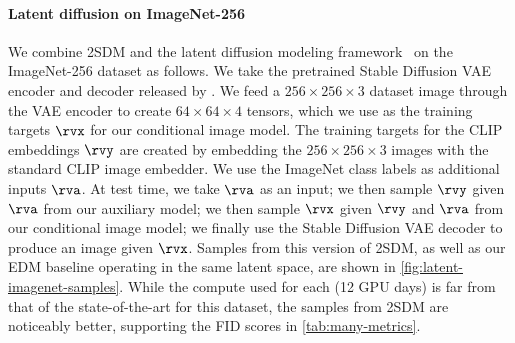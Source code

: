 
\paragraph{Latent diffusion on ImageNet-256}
We combine 2SDM and the latent diffusion modeling framework~\citep{rombach2022high} on the ImageNet-256 dataset as follows. We take the pretrained Stable Diffusion VAE encoder and decoder released by \citet{rombach2022high}. We feed a $256\times256\times3$ dataset image through the VAE encoder to create $64\times64\times4$ tensors, which we use as the training targets $\rvx$ for our conditional image model. The training targets for the CLIP embeddings $\rvy$ are created by embedding the $256\times256\times3$ images with the standard CLIP image embedder. We use the ImageNet class labels as additional inputs $\rva$. At test time, we take $\rva$ as an input; we then sample $\rvy$ given $\rva$ from our auxiliary model; we then sample $\rvx$ given $\rvy$ and $\rva$ from our conditional image model; we finally use the Stable Diffusion VAE decoder to produce an image given $\rvx$. Samples from this version of 2SDM, as well as our EDM baseline operating in the same latent space, are shown in \cref{fig:latent-imagenet-samples}. While the compute used for each (12 GPU days) is far from that of the state-of-the-art for this dataset, the samples from 2SDM are noticeably better, supporting the FID scores in \cref{tab:many-metrics}.


